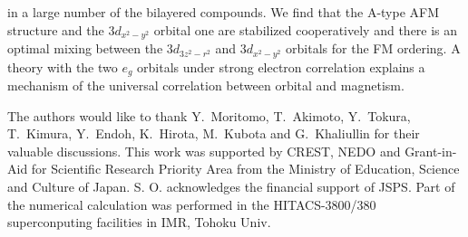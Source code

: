 in a large number of the bilayered compounds.
We find that
the A-type AFM structure and
the $3d_{x^2-y^2}$ orbital one are stabilized cooperatively
and there is
an optimal mixing between the $3d_{3z^2-r^2}$ and $3d_{x^2-y^2}$ orbitals for the FM ordering.
A theory with the two $e_g$ orbitals under strong electron correlation
explains a mechanism of the universal correlation between orbital and magnetism.
\par
The authors would like to thank Y.~Moritomo, T.~Akimoto, Y.~Tokura,
T.~Kimura, Y.~Endoh, K.~Hirota, M.~Kubota and G.~Khaliullin for their valuable discussions.
This work was supported by CREST, NEDO
and Grant-in-Aid for Scientific Research Priority Area
from the Ministry of Education, Science and Culture of Japan.
S. O. acknowledges the financial support of JSPS.
Part of the numerical calculation was performed in the HITACS-3800/380
superconputing facilities in IMR, Tohoku Univ.
